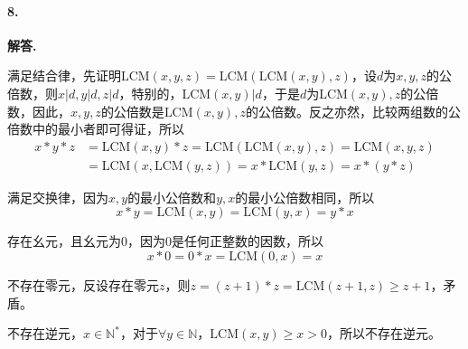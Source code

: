 \documentclass[12pt, a4paper, oneside]{ctexart}
\newenvironment{solution}{\par\noindent\textbf{解答. }}{\bigskip\par}
\begin{document}
\paragraph{8.}\begin{solution}
    
    满足结合律，先证明$\text{LCM}(x,y,z) = \text{LCM}(\text{LCM}(x,y),z)$，设$d$为$x, y,z$的公倍数，则$x|d,y|d,z|d$，特别的，$\text{LCM}(x, y)|d$，于是$d$为$\text{LCM}(x,y),z$的公倍数，因此，$x, y, z$的公倍数是$\text{LCM}(x, y),z$的公倍数。反之亦然，比较两组数的公倍数中的最小者即可得证，所以
    \begin{equation*}
        \begin{aligned}
            x*y*z&=\text{LCM}(x,y)*z=\text{LCM}(\text{LCM}(x, y), z)=\text{LCM}(x, y, z)\\
            &=\text{LCM}(x,\text{LCM}(y,z))=x*\text{LCM}(y,z)=x*(y*z)
        \end{aligned}
    \end{equation*}

    满足交换律，因为$x, y$的最小公倍数和$y,x$的最小公倍数相同，所以
    \begin{equation*}
        x*y=\text{LCM}(x, y)=\text{LCM}(y, x)=y*x
    \end{equation*}

    存在幺元，且幺元为$0$，因为$0$是任何正整数的因数，所以
    \begin{equation*}
        x*0=0*x=\text{LCM}(0, x) = x
    \end{equation*}

    不存在零元，反设存在零元$z$，则$z=(z+1)*z=\text{LCM}(z+1,z)\geqslant z+1$，矛盾。

    不存在逆元，$x\in \mathbb N^*$，对于$\forall y\in \mathbb N$，$\text{LCM}(x, y) \geqslant x > 0$，所以不存在逆元。
\end{solution}
\end{document}
